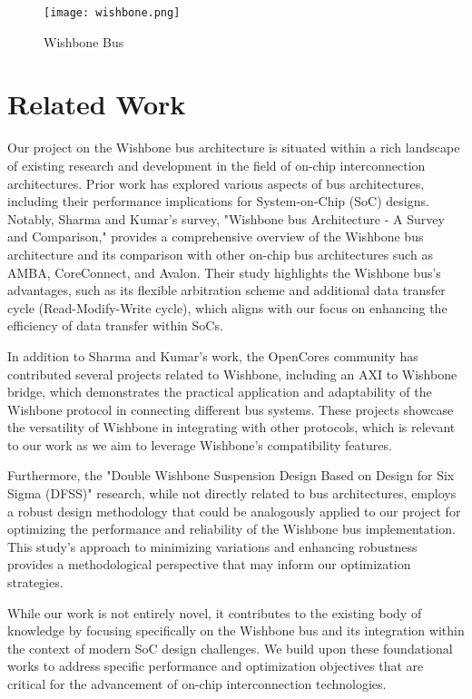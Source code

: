 \documentclass[conference]{IEEEtran}
\begin{document}
\begin{figure}[h]
    \centering
    \texttt{[image: wishbone.png]}
    \caption{Wishbone Bus}
    \label{wishbone}
\end{figure}




\section{Related Work}
Our project on the Wishbone bus architecture is situated within a rich landscape of existing research and development in the field of on-chip interconnection architectures. Prior work has explored various aspects of bus architectures, including their performance implications for System-on-Chip (SoC) designs. Notably, Sharma and Kumar's survey, "Wishbone bus Architecture - A Survey and Comparison," provides a comprehensive overview of the Wishbone bus architecture and its comparison with other on-chip bus architectures such as AMBA, CoreConnect, and Avalon. Their study highlights the Wishbone bus's advantages, such as its flexible arbitration scheme and additional data transfer cycle (Read-Modify-Write cycle)\cite{Sharma_2012}, which aligns with our focus on enhancing the efficiency of data transfer within SoCs.

In addition to Sharma and Kumar's work, the OpenCores community has contributed several projects related to Wishbone, including an AXI to Wishbone bridge, which demonstrates the practical application and adaptability of the Wishbone protocol in connecting different bus systems\cite{opencores_wishbone}. These projects showcase the versatility of Wishbone in integrating with other protocols, which is relevant to our work as we aim to leverage Wishbone's compatibility features.

Furthermore, the "Double Wishbone Suspension Design Based on Design for Six Sigma (DFSS)" research, while not directly related to bus architectures, employs a robust design methodology that could be analogously applied to our project for optimizing the performance and reliability of the Wishbone bus implementation\cite{10.1145/3421766.3421866}. This study's approach to minimizing variations and enhancing robustness provides a methodological perspective that may inform our optimization strategies.


While our work is not entirely novel, it contributes to the existing body of knowledge by focusing specifically on the Wishbone bus and its integration within the context of modern SoC design challenges. We build upon these foundational works to address specific performance and optimization objectives that are critical for the advancement of on-chip interconnection technologies.
\end{document}
